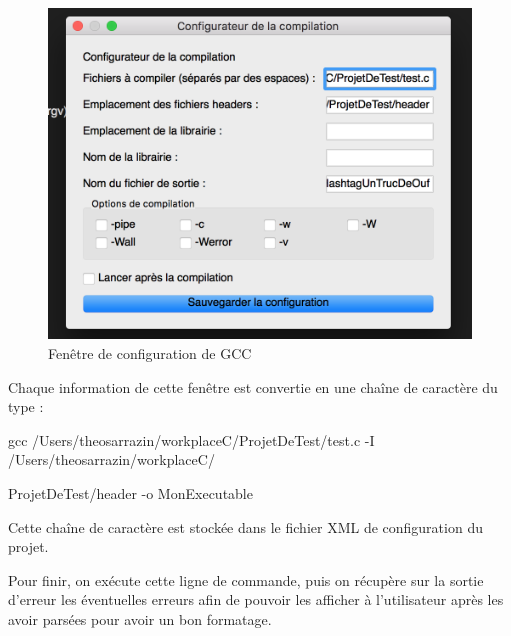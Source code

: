 \documentclass[a4paper,12pt]{article}
\begin{document}
			\begin{figure}[h!]
				\begin{center}
					\includegraphics[scale=0.7]{images/fenCompEx}
					\caption{Fenêtre de configuration de GCC}
				\end{center}
			\end{figure}

		Chaque information de cette fenêtre est convertie en une chaîne de caractère du type : 

		gcc /Users/theosarrazin/workplaceC/ProjetDeTest/test.c  -I /Users/theosarrazin/workplaceC/

		ProjetDeTest/header -o MonExecutable

		Cette chaîne de caractère est stockée dans le fichier XML de configuration du projet.

		Pour finir, on exécute cette ligne de commande, puis on récupère sur la sortie d'erreur les éventuelles erreurs afin de pouvoir les afficher à l'utilisateur après les avoir parsées pour avoir un bon formatage.
\end{document}
